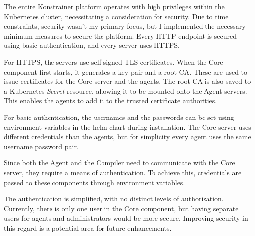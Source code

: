 The entire Konstrainer platform operates with high privileges within the Kubernetes cluster, necessitating a consideration for security. Due to time constraints, security wasn't my primary focus, but I implemented the necessary minimum measures to secure the platform. Every HTTP endpoint is secured using basic authentication, and every server uses HTTPS.

For HTTPS, the servers use self-signed TLS certificates. When the Core component first starts, it generates a key pair and a root CA. These are used to issue certificates for the Core server and the agents. The root CA is also saved to a Kubernetes \emph{Secret} resource, allowing it to be mounted onto the Agent servers. This enables the agents to add it to the trusted certificate authorities.

For basic authentication, the usernames and the passwords can be set using environment variables in the helm chart during installation. The Core server uses different credentials than the agents, but for simplicity every agent uses the same username password pair. 

Since both the Agent and the Compiler need to communicate with the Core server, they require a means of authentication. To achieve this, credentials are passed to these components through environment variables.

The authentication is simplified, with no distinct levels of authorization. Currently, there is only one user in the Core component, but having separate users for agents and administrators would be more secure. Improving security in this regard is a potential area for future enhancements.
